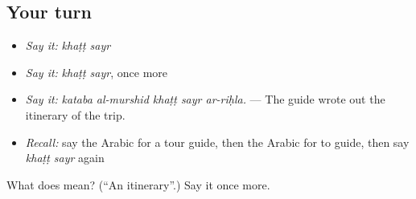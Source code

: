 \subsection*{Your turn}
\begin{itemize}
\raggedright
  \item \emph{Say it:} \emph{khaṭṭ sayr}
  \item \emph{Say it:} \emph{khaṭṭ sayr}, once more
  \item \emph{Say it:} \emph{kataba al-murshid khaṭṭ sayr ar-riḥla.} — The guide wrote out the itinerary of the trip.
  \item \emph{Recall:} say the Arabic for a tour guide, then the Arabic for to guide, then say \emph{khaṭṭ sayr} again
\end{itemize}

\begin{tcolorbox}[breakable,colback=teal!4,colframe=teal!35!black,title={Before you move on}]
What does   mean? (\textquotedblleft{}An itinerary\textquotedblright{}.) Say it once more.
\end{tcolorbox}
